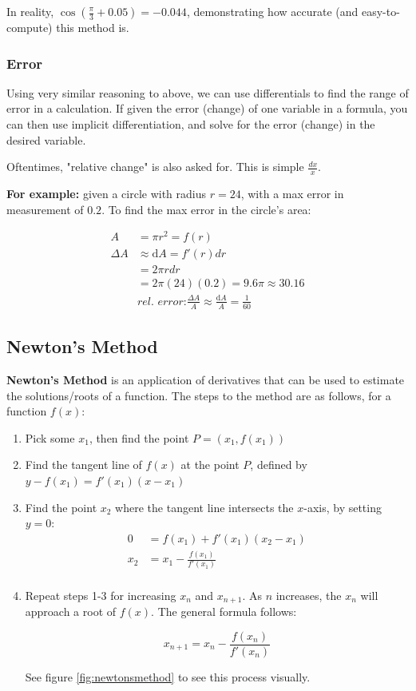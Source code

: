 \documentclass[12pt]{article}
\begin{document}
In reality, $\cos(\frac{\pi}{3}+0.05) = -0.044$, demonstrating how accurate (and easy-to-compute) this method is.

\subsubsection{Error}
Using very similar reasoning to above, we can use differentials to find the range of error in a calculation. If given the error (change) of one variable in a formula, you can then use implicit differentiation, and solve for the error (change) in the desired variable.

Oftentimes, "relative change" is also asked for. This is simple $\frac{dx}{x}$.

\textbf{For example:} given a circle with radius $r=24$, with a max error in measurement of $0.2$. To find the max error in the circle's area:

\begin{equation}
    \begin{split}
        A &= \pi r^2 = f(r)\\
        \Delta A &\approx \text{d}A = f'(r) dr\\
        &= 2\pi r dr\\
        &= 2\pi(24)(0.2) = 9.6 \pi \approx 30.16\\
        &\textit{rel. error:} \frac{\Delta A}{A} \approx \frac{\text{d}A}{A} = \frac{1}{60}
    \end{split}
\end{equation}
\subsection{Newton's Method}
\textbf{Newton's Method} is an application of derivatives that can be used to estimate the solutions/roots of a function. The steps to the method are as follows, for a function $f(x)$:

\begin{enumerate}
    \item Pick some $x_1$, then find the point $P = (x_1, f(x_1))$
    \item Find the tangent line of $f(x)$ at the point $P$, defined by $y - f(x_1) = f'(x_1)(x-x_1)$
    \item Find the point $x_2$ where the tangent line intersects the $x$-axis, by setting $y=0$: 
    \begin{equation}
        \begin{split}
            0 &= f(x_1)+f'(x_1)(x_2-x_1)\\
            x_2 &= x_1 - \frac{f(x_1)}{f'(x_1)}\\
        \end{split}
    \end{equation}
    
    \item Repeat steps 1-3 for increasing $x_n$ and $x_{n+1}$. As $n$ increases, the $x_n$ will approach a root of $f(x)$. The general formula follows:
    
    $$x_{n+1} = x_{n} - \frac{f(x_n)}{f'(x_n)}$$
    
    See figure \ref{fig:newtonsmethod} to see this process visually.
\end{enumerate}
\end{document}
